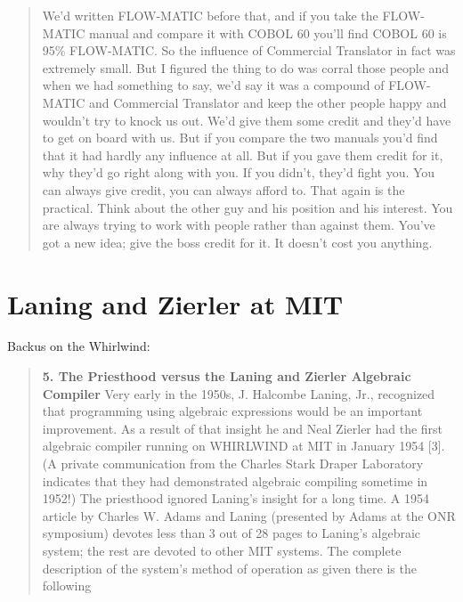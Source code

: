 \begin{quotation}
We’d written FLOW-MATIC before that, and if you take the FLOW-MATIC
manual and compare it with COBOL 60 you’ll find COBOL 60 is 95\% FLOW-MATIC. So the
influence of Commercial Translator in fact was extremely small. But I figured the thing to do was
corral those people and when we had something to say, we’d say it was a compound of FLOW-MATIC
and Commercial Translator and keep the other people happy and wouldn’t try to knock
us out. We’d give them some credit and they’d have to get on board with us. But if you compare
the two manuals you’d find that it had hardly any influence at all. But if you gave them credit for
it, why they’d go right along with you. If you didn’t, they’d fight you. You can always give credit,
you can always afford to.
That again is the practical. Think about the other guy and his position and his interest. You are
always trying to work with people rather than against them. You’ve got a new idea; give the
boss credit for it. It doesn’t cost you anything. 
\end{quotation}

\section{Laning and Zierler at MIT}
\label{sec:laning-zierler}


Backus on the Whirlwind\cite{Backus_1980_Programming_in_America_in_1950s}:
\begin{quotation}
  \textbf{5. The Priesthood versus the Laning and Zierler Algebraic Compiler}
  Very early in the 1950s, J. Halcombe Laning, Jr., recognized that
  programming using algebraic expressions would be an important improvement.
  As a result of that insight he and Neal Zierler had the first
  algebraic compiler
  running on WHIRLWIND at MIT in January 1954 [3]. (A private
    communication from the Charles Stark Draper Laboratory indicates
    that they had
  demonstrated algebraic compiling sometime in 1952!) The priesthood
  ignored Laning's insight for a long time. A 1954 article by Charles W. Adams
  and Laning (presented by Adams at the ONR symposium) devotes less than
  3 out of 28 pages to Laning's algebraic system; the rest are devoted to other
  MIT systems. The complete description of the system's method of operation
  as given there is the following
\end{quotation}

